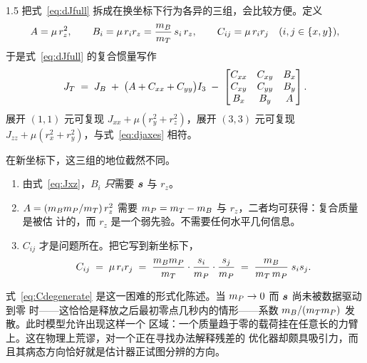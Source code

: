\begin{spacing}{1.5}
把式~\eqref{eq:dJfull} 拆成在换坐标下行为各异的三组，会比较方便。定义
\begin{equation}
A = \mu\, r_z^2, \qquad
B_i = \mu\, r_i r_z = \frac{m_B}{m_T}\, s_i\, r_z, \qquad
C_{ij} = \mu\, r_i r_j \quad (i,j\in\{x,y\}),
\label{eq:ABC}
\end{equation}
于是式~\eqref{eq:dJfull} 的复合惯量写作
\begin{equation}
J_T \;=\; J_B \;+\; \bigl(A + C_{xx} + C_{yy}\bigr) I_3
\;-\;
\begin{bmatrix}
C_{xx} & C_{xy} & B_x \\
C_{xy} & C_{yy} & B_y \\
B_x    & B_y    & A
\end{bmatrix}.
\label{eq:JABC}
\end{equation}
展开 $(1,1)$ 元可复现 $J_{xx}+\mu(r_y^2+r_z^2)$，展开 $(3,3)$ 元可复现
$J_{zz}+\mu(r_x^2+r_y^2)$，与式~\eqref{eq:djaxes} 相符。

在新坐标下，这三组的地位截然不同。
\begin{enumerate}
\item 由式~\eqref{eq:Jxz}，$B_i$ \emph{只}需要 $\bm{s}$ 与 $r_z$。
\item $A = (m_Bm_P/m_T)\,r_z^2$ 需要 $m_P = m_T-m_B$ 与 $r_z$，二者均可获得：复合质量是被估
计的，而 $r_z$ 是一个弱先验。不需要任何水平几何信息。
\item $C_{ij}$ 才是问题所在。把它写到新坐标下，
\begin{equation}
C_{ij} \;=\; \mu\, r_i r_j
\;=\; \frac{m_B m_P}{m_T}\cdot\frac{s_i}{m_P}\cdot\frac{s_j}{m_P}
\;=\; \frac{m_B}{m_T\,m_P}\; s_i s_j .
\label{eq:Cdegenerate}
\end{equation}
\end{enumerate}

式~\eqref{eq:Cdegenerate} 是这一困难的形式化陈述。当 $m_P\to0$ 而 $\bm{s}$ 尚未被数据驱动到零
时——这恰恰是释放之后最初零点几秒内的情形——系数 $m_B/(m_Tm_P)$ 发散。此时模型允许出现这样一个
区域：一个质量趋于零的载荷挂在任意长的力臂上。这在物理上荒谬，对一个正在寻找办法解释残差的
优化器却颇具吸引力，而且其病态方向恰好就是估计器正试图分辨的方向。


\end{spacing}
